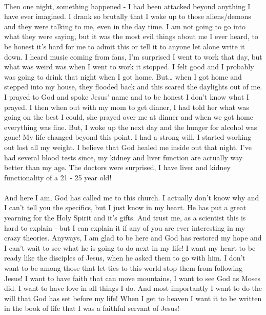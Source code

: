 \documentclass[a4paper]{article}
\begin{document}
\paragraph{}
Then one night, something happened - I had been attacked beyond anything I have ever imagined. I drank so
brutally that I woke up to those aliens/demons and they were talking to me, even in the day time. I am not
going to go into what they were saying, but it was the most evil things about me I ever heard, to be honest
it's hard for me to admit this or tell it to anyone let alone write it down. I heard music coming from fans,
I'm surprised I went to work that day, but what was weird was when I went to work it stopped. I felt good
and I probably was going to drink that night when I got home. But\ldots{} when I got home and stepped into my
house, they flooded back and this scared the daylights out of me. I prayed to God and spoke Jesus' name and
to be honest I don't know what I prayed. I then when out with my mom to get dinner, I had told her what was
going on the best I could, she prayed over me at dinner and when we got home everything was fine. But, I
woke up the next day and the hunger for alcohol was gone! My life changed beyond this point. I had a strong
will, I started working out lost all my weight. I believe that God healed me inside out that night. I've had
several blood tests since, my kidney and liver function are actually way better than my age. The doctors
were surprised, I have liver and kidney functionality of a 21 - 25 year old!

\paragraph{}
And here I am, God has called me to this church. I actually don't know why and I can't tell you the
specifics, but I just know in my heart. He has put a great yearning for the Holy Spirit and it's gifts. And
trust me, as a scientist this is hard to explain - but I can explain it if any of you are ever interesting
in my crazy theories. Anyways, I am glad to be here and God has restored my hope and I can't wait to see
what he is going to do next in my life! I want my heart to be ready like the disciples of Jesus, when he
asked them to go with him. I don't want to be among those that let ties to this world stop them from
following Jesus! I want to have faith that can move mountains, I want to see God as Moses did. I want to
have love in all things I do. And most importantly I want to do the will that God has set before my life!
When I get to heaven I want it to be written in the book of life that I was a faithful servant of Jesus!
\end{document}
